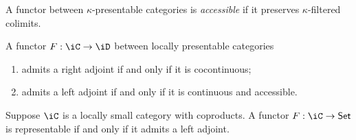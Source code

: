 \documentclass{amsart}
\begin{document}
\begin{defn}
  A functor between $\kappa$-presentable categories is \emph{accessible} if it preserves $\kappa$-filtered colimits.
\end{defn}

\begin{thm}
  A functor $F : \iC \to \iD$ between locally presentable categories
  \begin{enumerate}
  \item admits a right adjoint if and only if it is cocontinuous;
  \item admits a left adjoint if and only if it is continuous and accessible.
  \end{enumerate}
\end{thm}

\begin{lem}
  Suppose $\iC$ is a locally small category with coproducts.
  A functor $F : \iC \to \mathsf{Set}$ is representable if and only if it admits a left adjoint.
\end{lem}
\end{document}
